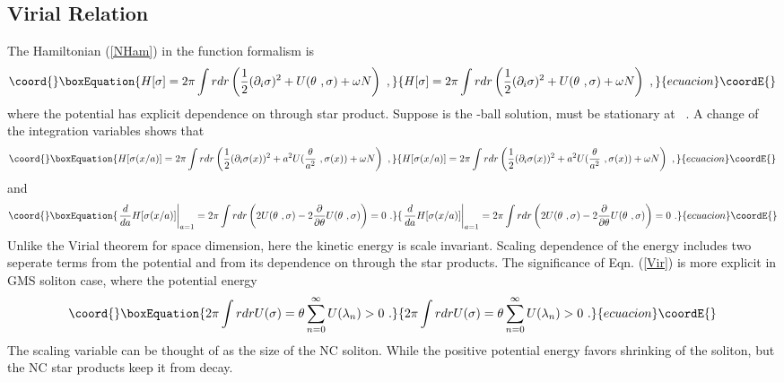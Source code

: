 \documentclass[a4paper,a4paper]{article}
\begin{document}
\subsection{Virial Relation}

The Hamiltonian (\ref{NHam}) in the function formalism is 
\begin{equation}\coord{}\boxEquation{
  H[\sigma]=2\pi\int rdr\left(\frac 12(\partial_i\sigma)^2+U(\theta\ , \sigma)+\omega N\right)\ ,
}{
  H[\sigma]=2\pi\int rdr\left(\frac 12(\partial_i\sigma)^2+U(\theta\ , \sigma)+\omega N\right)\ ,
}{ecuacion}\coordE{}\end{equation}
where the potential \coordHE{} has explicit dependence on \myHighlight{$\theta$}\coordHE{} 
through star product. Suppose \coordHE{} is the \coordHE{}-ball solution, 
\coordHE{} must be stationary at \coordHE{}\ . A change of the integration variables shows that 
\begin{equation}\coord{}\boxEquation{
  H[\sigma(x/a)]=2\pi\int rdr\left(\frac 12(\partial_i\sigma(x))^2+
a^2U(\frac{\theta}{a^2}\ ,\sigma(x))+\omega N\right)\ ,
}{
  H[\sigma(x/a)]=2\pi\int rdr\left(\frac 12(\partial_i\sigma(x))^2+
a^2U(\frac{\theta}{a^2}\ ,\sigma(x))+\omega N\right)\ ,
}{ecuacion}\coordE{}\end{equation}
and
\begin{equation}\coord{}\boxEquation{
  \left.\frac {d}{da}H[\sigma(x/a)]\right|_{a=1}=2\pi\int rdr\left(2U(\theta\ , \sigma)
  -2\frac{\partial}{\partial\theta}U(\theta\ , \sigma)\right)=0\ .                                       \label{Vir}
 }{
  \left.\frac {d}{da}H[\sigma(x/a)]\right|_{a=1}=2\pi\int rdr\left(2U(\theta\ , \sigma)
  -2\frac{\partial}{\partial\theta}U(\theta\ , \sigma)\right)=0\ .                                       }{ecuacion}\coordE{}\end{equation}
Unlike the Virial theorem for \coordHE{} space dimension, here the kinetic energy is scale invariant. 
Scaling dependence of the energy includes two seperate terms from the potential and from 
its dependence on \myHighlight{$\theta$}\coordHE{} through the star products. 
The significance of Eqn. (\ref{Vir}) is more explicit in GMS soliton case, where 
the potential energy 
\begin{equation}\coord{}\boxEquation{
2\pi\int rdrU(\sigma)=\theta\sum_{n=0}^{\infty}U(\lambda_n)>0\ . 
}{
2\pi\int rdrU(\sigma)=\theta\sum_{n=0}^{\infty}U(\lambda_n)>0\ . 
}{ecuacion}\coordE{}\end{equation}
The scaling variable \coordHE{} can be thought of as the size of the NC soliton. 
While the positive potential energy favors shrinking of the soliton, but 
the NC star products keep it from decay. 
\end{document}
